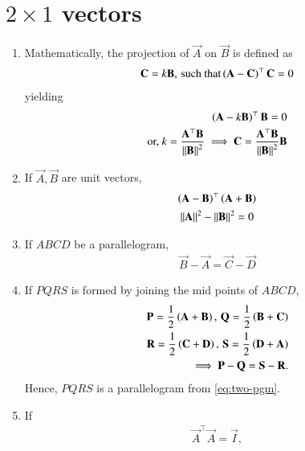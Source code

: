 \section{$2\times 1$ vectors}

\begin{enumerate}[label=\thesection.\arabic*.,ref=\thesection.\theenumi]
	\item Mathematically, 
the projection of $\vec{A}$ on $\vec{B}$ is defined as
		\begin{align}
	\mathbf{C} = k \mathbf{B},\, \text{such that}
	\left(\mathbf{A}-\mathbf{C}\right)^{\top}\mathbf{C} = 0
\end{align}
yielding
\begin{align}
	\left(\mathbf{A}-k\mathbf{B}\right)^{\top}\mathbf{B} = 0
	\\
	\text{or, } k = 
	\frac{\mathbf{A}^{\top}\mathbf{B}}{\left\lVert\mathbf{B}\right\rVert^2}
	\implies 
	\mathbf{C} = 
	\frac{\mathbf{A}^{\top}\mathbf{B}}{\left\lVert\mathbf{B}\right\rVert^2}
 \mathbf{B}
	\label{eq:12/10/3/4/proj}
\end{align}
\item If $\vec{A}, \vec{B}$ are unit vectors, 
\begin{multline}
	\left(\mathbf{A}-\mathbf{B}\right)^{\top} 
	\left(\mathbf{A}+\mathbf{B}\right) 
	\\
\left\lVert\mathbf{A}\right\rVert^2 - \left\lVert\mathbf{B}\right\rVert^2
	= 0
	\label{eq:12/10/3/11/unit}
\end{multline}
  \item If $ABCD$ be a parallelogram,
	  \label{prop:two-pgm}
  \begin{align}
	  \label{eq:two-pgm}
 \vec{B}-\vec{A} = \vec{C} -\vec{D}
  \end{align}
  \item 
If $PQRS$ is formed by joining the mid points of $ABCD$, 
\begin{align}
  \mathbf{P} = \frac{1}{2}\left(\mathbf{A}+\mathbf{B}\right) 
  ,\,
 \mathbf{Q} = \frac{1}{2}\left(\mathbf{B}+\mathbf{C}\right) 
 \\
 \mathbf{R} = \frac{1}{2}\left(\mathbf{C}+\mathbf{D}\right)   
  ,\,
 \mathbf{S} = \frac{1}{2}\left(\mathbf{D}+\mathbf{A}\right)  
 \\
	\implies 
 \mathbf{P}-\mathbf{Q} = \mathbf{S} -\mathbf{R}.
  \label{eq:10/7/4/8det2f}
\end{align}
Hence, $PQRS$ is a parallelogram
	  from \eqref{eq:two-pgm}.
  \item If 
\begin{align}
	\vec{A}^{\top}\vec{A} =\vec{I},
\label{eq:12/10/3/5/inner}
\end{align}

\end{enumerate}
